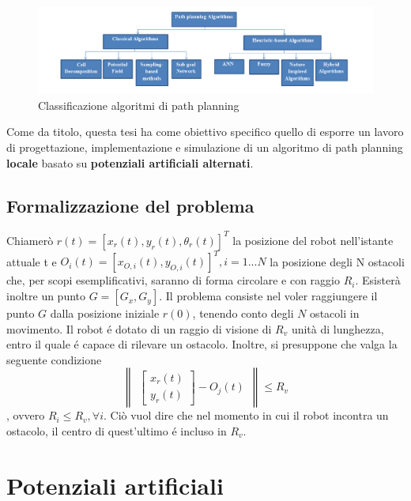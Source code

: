 \documentclass[14pt,twoside,a4paper]{extarticle}
\begin{document}
\begin{figure}[H]
\caption{Classificazione algoritmi di path planning\cite{mac2016}}
\includegraphics[width=\textwidth]{algoritmiPP.png}
\end{figure}

Come da titolo, questa tesi ha come obiettivo specifico quello di esporre un lavoro di progettazione, implementazione e simulazione di un algoritmo di path planning \textbf{locale} basato su \textbf{potenziali artificiali alternati}. 

\subsection{Formalizzazione del problema}

Chiamerò \( r(t) = [x_r(t),y_r(t),\theta_r(t)]^T\) la posizione del robot nell'istante attuale t e \( O_i(t) = [x_{O,i}(t),y_{O,i}(t)]^T, i = 1...N\) la posizione degli N ostacoli che, per scopi esemplificativi, saranno di forma circolare e con raggio \(R_i\). Esisterà inoltre un punto \(G = [G_x, G_y]\). Il problema consiste nel voler raggiungere il punto \(G\) dalla posizione iniziale \(r(0)\), tenendo conto degli \(N\) ostacoli in movimento. Il robot é dotato di un raggio di visione di \(R_v\) unità di lunghezza, entro il quale é capace di rilevare un ostacolo. Inoltre, si presuppone che valga la seguente condizione
\[\begin{Vmatrix}\begin{bmatrix} x_r(t)\\ y_r(t) \end{bmatrix} - O_j(t)\end{Vmatrix} \leq R_v \], ovvero \( R_i \leq R_v, \forall i\). Ciò vuol dire che nel momento in cui il robot incontra un ostacolo, il centro di quest'ultimo é incluso in \(R_v\).

\section{Potenziali artificiali}
\end{document}

